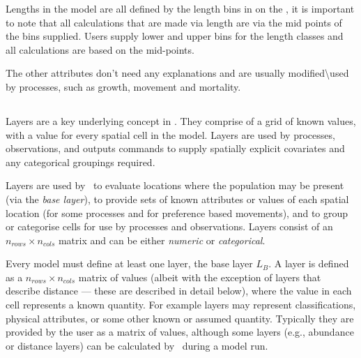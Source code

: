 Lengths in the model are all defined by the length bins in on the , it is important to note that all calculations that are made via length are via the mid points of the bins supplied. Users supply lower and upper bins for the length classes and all calculations are based on the mid-points.

The other attributes don't need any explanations and are usually modified\textbackslash used by processes, such as growth, movement and mortality.

\subsection{\label{sec:layers}}
Layers are a key underlying concept in \IBM. They comprise of a grid of known values, with a value for every spatial cell in the model. Layers are used by processes, observations, and outputs commands to supply spatially explicit covariates and any categorical groupings required. 

Layers are used by \IBM\ to evaluate locations where the population may be present (via the \emph{base layer}), to provide sets of known attributes or values of each spatial location (for some processes and for preference based movements), and to group or categorise cells for use by processes and observations. Layers consist of an $n_{rows} \times n_{cols}$ matrix and can be either \emph{numeric} or \emph{categorical}. 

Every model must define at least one layer, the base layer $L_B$. A layer is defined as a $n_{rows} \times n_{cols}$ matrix of values (albeit with the exception of layers that describe distance --- these are described in detail below), where the value in each cell represents a known quantity. For example layers may represent classifications, physical attributes, or some other known or assumed quantity. Typically they are provided by the user as a matrix of values, although some layers (e.g., abundance or distance layers) can be calculated by \IBM\ during a model run. 

